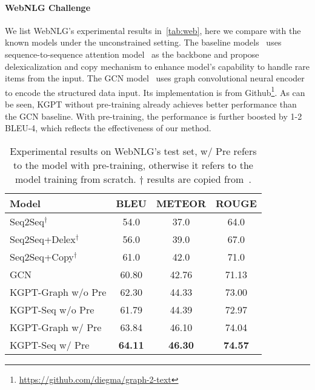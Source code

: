 \documentclass[11pt,a4paper]{article}
\newcommand{\model}{KGPT\xspace}
\begin{document}
\paragraph{WebNLG Challenge}
We list WebNLG's experimental results in~\autoref{tab:web}, here we compare with the known models under the unconstrained setting. The baseline models~\cite{shimorina2018handling} uses sequence-to-sequence attention model~\cite{luong2015effective} as the backbone and propose delexicalization and copy mechanism to enhance model's capability to handle rare items from the input. The GCN model~\cite{marcheggiani2018deep} uses graph convolutional neural encoder to encode the structured data input. Its implementation is from Github\footnote{\url{https://github.com/diegma/graph-2-text}}. As can be seen, \model without pre-training already achieves better performance than the GCN baseline. With pre-training, the performance is further boosted by 1-2 BLEU-4, which reflects the effectiveness of our method. 
\begin{table}[!thb]
\small
\begin{tabular}{lccc}
\hline
Model                & BLEU  & METEOR & ROUGE \\
\hline
Seq2Seq$^{\dagger}$           & 54.0  & 37.0    & 64.0 \\
Seq2Seq+Delex$^{\dagger}$   & 56.0  & 39.0    & 67.0 \\
Seq2Seq+Copy$^{\dagger}$    & 61.0  & 42.0    & 71.0 \\
GCN  & 60.80  & 42.76   & 71.13 \\
\hline
\model-Graph w/o Pre   & 62.30 & 44.33  & 73.00 \\
\model-Seq w/o Pre   & 61.79 & 44.39  & 72.97 \\
\hline
\model-Graph w/ Pre    & 63.84    &   46.10    &  74.04 \\
\model-Seq w/ Pre    &  \textbf{64.11}     &   \textbf{46.30}    &  \textbf{74.57} \\
\hline
\end{tabular}
\caption{Experimental results on WebNLG's test set, w/ Pre refers to the model with pre-training, otherwise it refers to the model training from scratch. ${\dagger}$ results are copied from~\citet{shimorina2018handling}. }
\label{tab:web}
\vspace{-3ex}
\end{table}
\end{document}
